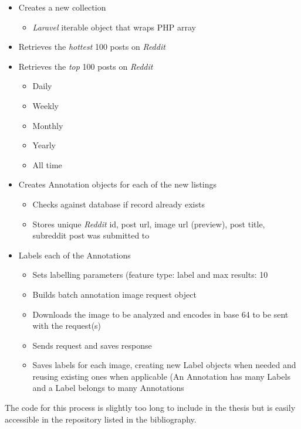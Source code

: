 \documentclass[msc,oneside]{ubcthesis}%
\begin{document}
\begin{itemize}
\item{Creates a new collection}
	\begin{itemize}
	\item{\textit{Laravel} iterable object that wraps PHP array}
	\end{itemize}
\item{Retrieves the \textit{hottest} 100 posts on \textit{Reddit}}
\item{Retrieves the \textit{top} 100 posts on \textit{Reddit}}
	\begin{itemize}
	\item{Daily}
	\item{Weekly}
	\item{Monthly}
	\item{Yearly}
	\item{All time}	
	\end{itemize}
\item{Creates Annotation objects for each of the new listings}
	\begin{itemize}
	\item{Checks against database if record already exists}
	\item{Stores unique \textit{Reddit} id, post url, image url (preview), post title, subreddit post was submitted to}
	\end{itemize}
\item{Labels each of the Annotations}
	\begin{itemize}
	\item{Sets labelling parameters (feature type: label and max results: 10}
	\item{Builds batch annotation image request object}
	\item{Downloads the image to be analyzed and encodes in base 64 to be sent with the request(s)}
	\item{Sends request and saves response}
	\item{Saves labels for each image, creating new Label objects when needed and reusing existing ones when applicable (An Annotation has many Labels and a Label belongs to many Annotations}
	\end{itemize}
\end{itemize}

The code for this process is slightly too long to include in the thesis but is easily accessible in the repository listed in the bibliography.
\end{document}
